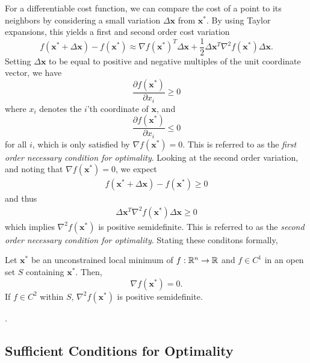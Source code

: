 For a differentiable cost function, we can compare the cost of a point to its neighbors by considering a small variation $\Delta \bm{x}$ from $\bm{x}^*$. By using Taylor expansions, this yields a first and second order cost variation
\begin{equation}
    f(\bm{x}^* + \Delta \bm{x}) - f(\bm{x}^*) \approx \nabla f(\bm{x}^*)^T \Delta \bm{x} + \frac{1}{2} \Delta \bm{x}^T \nabla^2 f(\bm{x}^*) \Delta \bm{x}.
\end{equation}
Setting $\Delta \bm{x}$ to be equal to positive and negative multiples of the unit coordinate vector, we have 
\begin{equation}
    \frac{\partial f(\bm{x}^*)}{\partial x_i} \geq 0
\end{equation}
where $x_i$ denotes the $i$'th coordinate of $\bm{x}$, and 
\begin{equation}
    \frac{\partial f(\bm{x}^*)}{\partial x_i} \leq 0
\end{equation}
for all $i$, which is only satisfied by $\nabla f(\bm{x}^*) = 0$.  This is referred to as the \textit{first order necessary condition for optimality}. Looking at the second order variation, and noting that $\nabla f(\bm{x}^*) = 0$, we expect
\begin{align}
f(\bm{x}^* + \Delta \bm{x}) - f(\bm{x}^*) \geq 0
\end{align}
and thus
\begin{align}
\Delta \bm{x}^T \nabla^2 f(\bm{x}^*) \Delta \bm{x} \geq 0
\end{align}
which implies $\nabla^2 f(\bm{x}^*)$ is positive semidefinite. This is referred to as the \textit{second order necessary condition for optimality}. Stating these conditons formally, 

\begin{theorem}
Let $\bm{x}^*$ be an unconstrained local minimum of $f:\mathbb{R}^n \to \mathbb{R}$ and $f \in C^1$ in an open set $S$ containing $\bm{x}^*$. Then,
\begin{equation}
    \nabla f(\bm{x}^*) = 0.
\end{equation}
If $f \in C^2$ within $S$, $\nabla^2 f(\bm{x}^*)$ is positive semidefinite. 
\end{theorem}

.

\subsection{Sufficient Conditions for Optimality}


